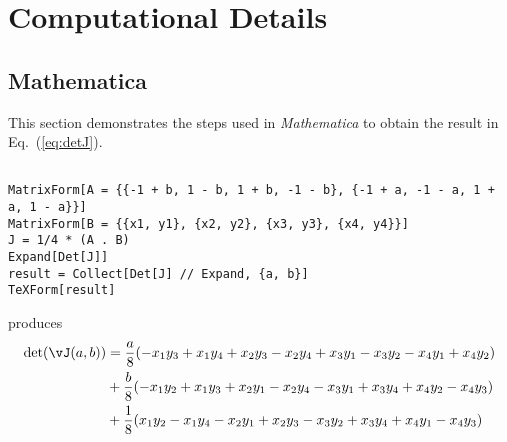 \appendix

\chapter{Computational Details}
\label{chap:compdetails}

\section{Mathematica}

This section demonstrates the steps used in {\em Mathematica} to obtain 
the result in Eq.~(\ref{eq:detJ}).

\begin{verbatim}

MatrixForm[A = {{-1 + b, 1 - b, 1 + b, -1 - b}, {-1 + a, -1 - a, 1 + a, 1 - a}}]
MatrixForm[B = {{x1, y1}, {x2, y2}, {x3, y3}, {x4, y4}}]
J = 1/4 * (A . B)
Expand[Det[J]]
result = Collect[Det[J] // Expand, {a, b}]
TeXForm[result]
\end{verbatim}
produces
\begin{align}
\det(\vJ(a, b)) & = 
   \frac{a}{8}  (-x_1 y_3+x_1 y_4+x_2 y_3-x_2 y_4+x_3 y_1-x_3
   y_2-x_4 y_1+x_4 y_2)
   \\ \nonumber
   & +\frac{b}{8}  (-x_1 y_2+x_1 y_3+x_2
   y_1-x_2 y_4-x_3 y_1+x_3 y_4+x_4 y_2-x_4 y_3)
   \\ \nonumber
   & +\frac{1}{8}
   (x_1 y_2-x_1 y_4-x_2 y_1+x_2 y_3-x_3 y_2+x_3
   y_4+x_4 y_1-x_4 y_3)
\end{align}
